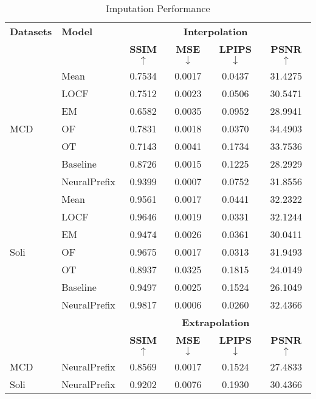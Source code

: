 \documentclass[10pt, conference, compsocconf]{IEEEtran}
\begin{document}
\begin{table}[h!]
    \centering
    \caption{Imputation Performance}
    \label{tab:imputation_performance}
    \begin{tabular}{llcccc}
        \toprule
        \textbf{Datasets} & \textbf{Model} & \multicolumn{4}{c}{\textbf{Interpolation}} \\ 
        \cmidrule(lr){3-6} 
        & & \textbf{SSIM}$\uparrow$ & \textbf{MSE}$\downarrow$ & \textbf{LPIPS}$\downarrow$ & \textbf{PSNR}$\uparrow$ \\ 
        \midrule
        \multirow{7}{*}{MCD} 
         & Mean & 0.7534  & 0.0017 & 0.0437 & 31.4275  \\
        & LOCF & 0.7512  & 0.0023 & 0.0506  &  30.5471 \\ 
       & EM & 0.6582  &  0.0035& 0.0952  & 28.9941  \\ 
         MCD& OF & 0.7831  & 0.0018 & 0.0370 &   34.4903\\ 
        
         & OT & 0.7143  &0.0041  & 0.1734 &  33.7536 \\ 

        & Baseline \cite{kanaa2021simple} & 0.8726  & 0.0015  & 0.1225 &  28.2929 \\ 
        & NeuralPrefix & 0.9399 & 0.0007 & 0.0752 & 31.8556  \\ 
        \midrule
        \multirow{7}{*}{Soli} 
        & Mean & 0.9561  & 0.0017 & 0.0441 &  32.2322 \\ 
        &  LOCF & 0.9646 & 0.0019  & 0.0331 & 32.1244 \\ 
        & EM & 0.9474  &  0.0026  & 0.0361 &  30.0411 \\ 
        Soli& OF & 0.9675  & 0.0017 & 0.0313 &  31.9493 \\ 
        
        & OT & 0.8937 & 0.0325 & 0.1815 & 24.0149  \\ 
        & Baseline \cite{kanaa2021simple} & 0.9497 & 0.0025 & 0.1524 & 26.1049  \\ 
        & NeuralPrefix & 0.9817 & 0.0006 & 0.0260 & 32.4366  \\ 
        \midrule
        \multicolumn{2}{c}{} & \multicolumn{4}{c}{\textbf{Extrapolation}} \\
        \cmidrule(lr){3-6} 
        & & \textbf{SSIM}$\uparrow$ & \textbf{MSE}$\downarrow$ & \textbf{LPIPS}$\downarrow$ & \textbf{PSNR}$\uparrow$ \\ 
        \midrule
         MCD & NeuralPrefix & 0.8569 & 0.0017 &  0.1524 & 27.4833  \\
         \midrule
         Soli & NeuralPrefix &0.9202 & 0.0076 & 0.1930 & 30.4366 \\ 
         \bottomrule
    \end{tabular}
\end{table}
\end{document}
